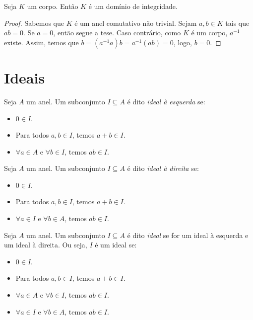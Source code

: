 \begin{prop}
    Seja $K$ um corpo. Então $K$ é um domínio de integridade.
\end{prop}
\begin{proof}
Sabemos que $K$ é um anel comutativo não trivial. Sejam $a, b \in K$ tais que $ab=0$. Se $a=0$, então segue a tese. Caso contrário, como $K$ é um corpo, $a^{-1}$ existe. Assim, temos que $b=(a^{-1}a)b=a^{-1}(ab)=0$, logo, $b=0$.
\end{proof}
\section{Ideais}
\begin{definition}
    Seja $A$ um anel. Um subconjunto $I \subseteq A$ é dito \emph{ideal à esquerda} se:
    \begin{itemize}
        \item $0 \in I$.
        \item Para todos $a, b \in I$, temos $a+b\in I$.
        \item $\forall a \in A$ e $\forall b \in I$, temos $ab \in I$.
    \end{itemize}
\end{definition}

\begin{definition}
    Seja $A$ um anel. Um subconjunto $I \subseteq A$ é dito \emph{ideal à direita} se:
    \begin{itemize}
        \item $0 \in I$.
        \item Para todos $a, b \in I$, temos $a+b\in I$.
        \item $\forall a \in I$ e $\forall b \in A$, temos $ab \in I$.
    \end{itemize}
\end{definition}

\begin{definition}[Ideal]
    Seja $A$ um anel. Um subconjunto $I \subseteq A$ é dito \emph{ideal} se for um ideal à esquerda e um ideal à direita. Ou seja, $I$ é um ideal se:
    \begin{itemize}
        \item $0 \in I$.
        \item Para todos $a, b \in I$, temos $a+b\in I$.
        \item $\forall a \in A$ e $\forall b \in I$, temos $ab \in I$.
        \item $\forall a \in I$ e $\forall b \in A$, temos $ab \in I$.

    \end{itemize}
\end{definition}


